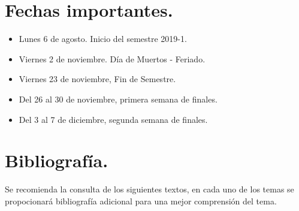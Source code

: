 \documentclass[12pt]{article}
\begin{document}
\section{Fechas importantes.}
\begin{itemize}
\item Lunes 6 de agosto. Inicio del semestre 2019-1.
\item Viernes 2 de noviembre. Día de Muertos - Feriado.
\item Viernes 23 de noviembre, Fin de Semestre.
\item Del 26 al 30 de noviembre, primera semana de finales.
\item Del 3 al 7 de diciembre,  segunda semana de finales.
\end{itemize}
\section{Bibliografía.}
Se recomienda la consulta de los siguientes textos, en cada uno de los temas se propocionará bibliografía adicional para una mejor comprensión del tema.
\nocite{*}


\end{document}
